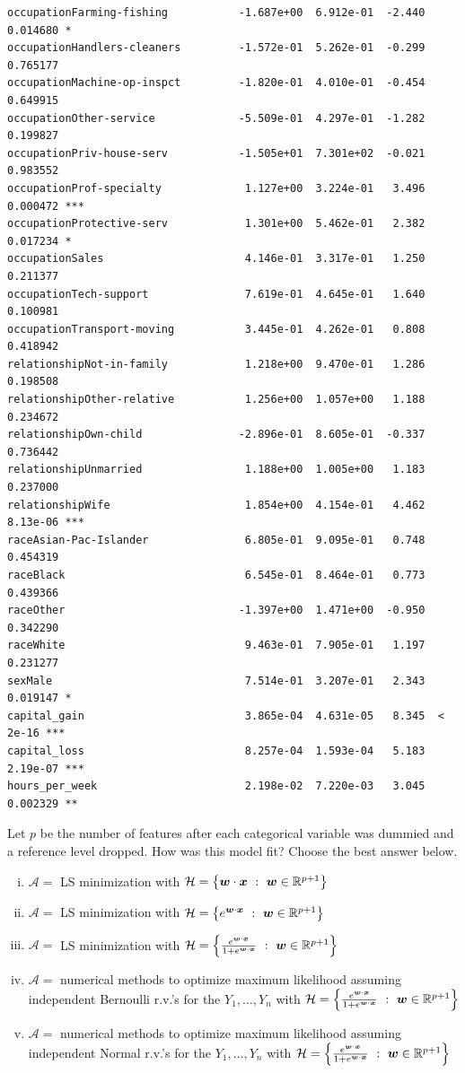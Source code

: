 \documentclass[12pt]{article}
\begin{document}
\begin{verbatim}
occupationFarming-fishing           -1.687e+00  6.912e-01  -2.440 0.014680 *  
occupationHandlers-cleaners         -1.572e-01  5.262e-01  -0.299 0.765177    
occupationMachine-op-inspct         -1.820e-01  4.010e-01  -0.454 0.649915    
occupationOther-service             -5.509e-01  4.297e-01  -1.282 0.199827    
occupationPriv-house-serv           -1.505e+01  7.301e+02  -0.021 0.983552    
occupationProf-specialty             1.127e+00  3.224e-01   3.496 0.000472 ***
occupationProtective-serv            1.301e+00  5.462e-01   2.382 0.017234 *  
occupationSales                      4.146e-01  3.317e-01   1.250 0.211377    
occupationTech-support               7.619e-01  4.645e-01   1.640 0.100981    
occupationTransport-moving           3.445e-01  4.262e-01   0.808 0.418942    
relationshipNot-in-family            1.218e+00  9.470e-01   1.286 0.198508    
relationshipOther-relative           1.256e+00  1.057e+00   1.188 0.234672    
relationshipOwn-child               -2.896e-01  8.605e-01  -0.337 0.736442    
relationshipUnmarried                1.188e+00  1.005e+00   1.183 0.237000    
relationshipWife                     1.854e+00  4.154e-01   4.462 8.13e-06 ***
raceAsian-Pac-Islander               6.805e-01  9.095e-01   0.748 0.454319    
raceBlack                            6.545e-01  8.464e-01   0.773 0.439366    
raceOther                           -1.397e+00  1.471e+00  -0.950 0.342290    
raceWhite                            9.463e-01  7.905e-01   1.197 0.231277    
sexMale                              7.514e-01  3.207e-01   2.343 0.019147 *  
capital_gain                         3.865e-04  4.631e-05   8.345  < 2e-16 ***
capital_loss                         8.257e-04  1.593e-04   5.183 2.19e-07 ***
hours_per_week                       2.198e-02  7.220e-03   3.045 0.002329 ** 
\end{verbatim}

\normalsize


 Let $p$ be the number of features after each categorical variable was dummied and a reference level dropped. How was this model fit? Choose the best answer below.

\begin{enumerate}[i)]
\item $\mathcal{A} = $ LS minimization with $\mathcal{H} = \left\{\boldsymbol{w} \cdot \boldsymbol{x}~:~ \boldsymbol{w} \in \mathbb{R}^{p+1}\right\}$
\item $\mathcal{A} = $ LS minimization with $\mathcal{H} = \left\{e^{\boldsymbol{w} \cdot \boldsymbol{x}}~:~ \boldsymbol{w} \in \mathbb{R}^{p+1}\right\}$
\item $\mathcal{A} = $ LS minimization with $\mathcal{H} = \left\{\frac{e^{\boldsymbol{w} \cdot \boldsymbol{x}}}{1 + e^{\boldsymbol{w} \cdot \boldsymbol{x}}}~:~ \boldsymbol{w} \in \mathbb{R}^{p+1}\right\}$
\item $\mathcal{A} = $ numerical methods to optimize maximum likelihood assuming independent Bernoulli r.v.'s for the $Y_1, \ldots, Y_n$ with $\mathcal{H} = \left\{\frac{e^{\boldsymbol{w} \cdot \boldsymbol{x}}}{1 + e^{\boldsymbol{w} \cdot \boldsymbol{x}}}~:~ \boldsymbol{w} \in \mathbb{R}^{p+1}\right\}$
\item $\mathcal{A} = $ numerical methods to optimize maximum likelihood assuming independent Normal r.v.'s for the $Y_1, \ldots, Y_n$ with $\mathcal{H} = \left\{\frac{e^{\boldsymbol{w} \cdot \boldsymbol{x}}}{1 + e^{\boldsymbol{w} \cdot \boldsymbol{x}}}~:~ \boldsymbol{w} \in \mathbb{R}^{p+1}\right\}$
\end{enumerate}
\end{document}
